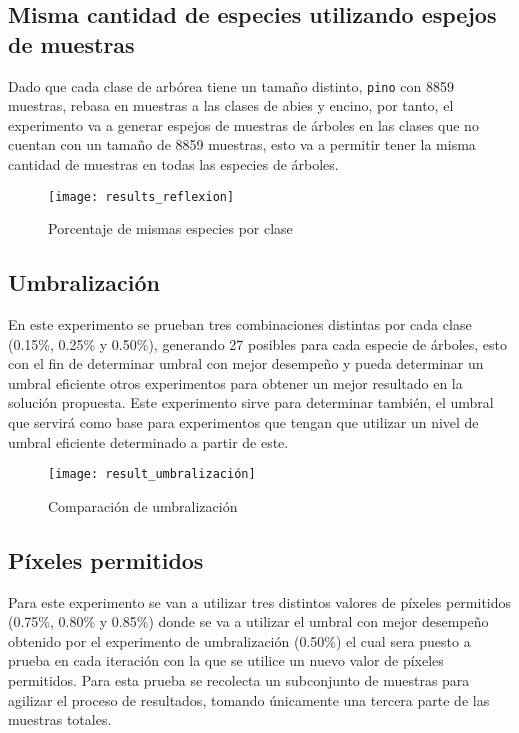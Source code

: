 \clearpage
\subsection{Misma cantidad de especies utilizando espejos de muestras}
Dado que cada clase  de arbórea tiene un tamaño distinto, \texttt{pino} con 8859 muestras, rebasa en muestras a las clases de abies  y encino, por tanto, el experimento va a generar espejos de muestras de árboles  en las clases que no cuentan con un tamaño de 8859 muestras, esto va a permitir tener la misma cantidad de muestras en todas las especies de árboles. 
\begin{figure}[h!]
  \centering  
  \begin{minipage}[b]{0.75\textwidth}
        \texttt{[image: results\_reflexion]}
    \caption{Porcentaje de mismas especies por clase} 
    \label{Porcentaje de mismas especies por clase}
  \end{minipage}
\end{figure}

\clearpage
\subsection{Umbralización}
En este experimento se prueban tres combinaciones distintas por cada clase (0.15\%, 0.25\% y 0.50\%), generando 27 posibles para cada especie de árboles, esto con el fin de determinar umbral con mejor desempeño y pueda determinar un umbral eficiente otros experimentos para obtener un mejor resultado en la solución propuesta. Este experimento sirve para determinar también, el umbral que servirá como base para experimentos que tengan que utilizar un nivel de umbral eficiente determinado a partir de este.


\begin{figure}[h!]
  \centering  
  \begin{minipage}[b]{1\textwidth}
        \texttt{[image: result\_umbralización]}
    \caption{Comparación de umbralización} 
    \label{Comparación de umbralización}
  \end{minipage}
\end{figure}

\clearpage

\subsection{Píxeles permitidos}
Para este experimento se van a utilizar tres distintos valores de píxeles permitidos (0.75\%, 0.80\% y 0.85\%) donde se va a utilizar el umbral con mejor desempeño obtenido por el experimento de umbralización (0.50\%) el cual sera puesto a prueba en cada iteración con la que se utilice un nuevo valor de píxeles permitidos. Para esta prueba se recolecta un subconjunto de muestras para agilizar el proceso de resultados, tomando únicamente una tercera parte de las muestras totales.

